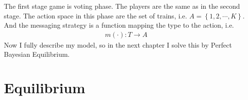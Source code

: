 \documentclass{article}
\begin{document}
The first stage game is voting phase. The players are the same as in the second stage. The action space in this phase are the set of trains, i.e. $A = \left\{ 1,2,\cdots, K \right\}$. And the messaging strategy is a function mapping the type to the action, i.e.
\begin{align*}
	m(\cdot) : T \to A
\end{align*}
Now I fully describe my model, so in the next chapter I solve this by Perfect Bayesian Equilibrium.


\section{Equilibrium}
\end{document}
